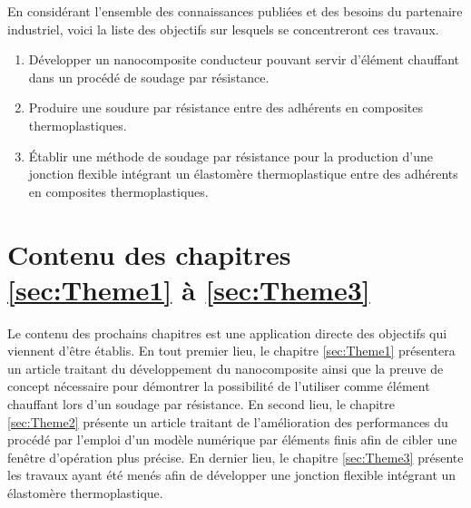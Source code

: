 En considérant l'ensemble des connaissances publiées et des besoins du partenaire industriel, voici la liste des objectifs sur lesquels se concentreront ces travaux. 

\begin{enumerate}
	\item Développer un nanocomposite conducteur pouvant servir d'élément chauffant dans un procédé de soudage par résistance. 
	\item Produire une soudure par résistance entre des adhérents en composites thermoplastiques. 
	\item Établir une méthode de soudage par résistance pour la production d'une jonction flexible intégrant un élastomère thermoplastique entre des adhérents en composites thermoplastiques. 
\end{enumerate}

\section{Contenu des chapitres \ref{sec:Theme1} à \ref{sec:Theme3}}

Le contenu des prochains chapitres est une application directe des objectifs qui viennent d'être établis. 
En tout premier lieu, le chapitre \ref{sec:Theme1} présentera un article traitant du développement du nanocomposite ainsi que la preuve de concept nécessaire pour démontrer la possibilité de l'utiliser comme élément chauffant lors d'un soudage par résistance. 
En second lieu, le chapitre \ref{sec:Theme2} présente un article traitant de l'amélioration des performances du procédé par l'emploi d'un modèle numérique par éléments finis afin de cibler une fenêtre d'opération plus précise. 
En dernier lieu, le chapitre \ref{sec:Theme3} présente les travaux ayant été menés afin de développer une jonction flexible intégrant un élastomère thermoplastique. 